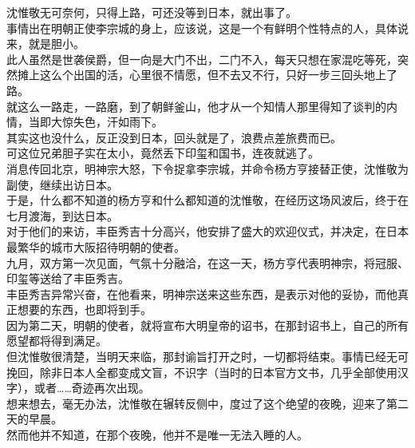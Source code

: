 \begin{multicols}{\theparacolNo}
沈惟敬无可奈何，只得上路，可还没等到日本，就出事了。\\

事情出在明朝正使李宗城的身上，应该说，这是一个有鲜明个性特点的人，具体说来，就是胆小。\\

此人虽然是世袭侯爵，但一向是大门不出，二门不入，每天只想在家混吃等死，突然摊上这么个出国的活，心里很不情愿，但不去又不行，只好一步三回头地上了路。\\

就这么一路走，一路磨，到了朝鲜釜山，他才从一个知情人那里得知了谈判的内情，当即大惊失色，汗如雨下。\\

其实这也没什么，反正没到日本，回头就是了，浪费点差旅费而已。\\

可这位兄弟胆子实在太小，竟然丢下印玺和国书，连夜就逃了。\\

消息传回北京，明神宗大怒，下令捉拿李宗城，并命令杨方亨接替正使，沈惟敬为副使，继续出访日本。\\

于是，什么都不知道的杨方亨和什么都知道的沈惟敬，在经历这场风波后，终于在七月渡海，到达日本。\\

对于他们的来访，丰臣秀吉十分高兴，他安排了盛大的欢迎仪式，并决定，在日本最繁华的城市大阪招待明朝的使者。\\

九月，双方第一次见面，气氛十分融洽，在这一天，杨方亨代表明神宗，将冠服、印玺等送给了丰臣秀吉。\\

丰臣秀吉异常兴奋，在他看来，明神宗送来这些东西，是表示对他的妥协，而他真正想要的东西，也即将到手。\\

因为第二天，明朝的使者，就将宣布大明皇帝的诏书，在那封诏书上，自己的所有愿望都将得到满足。\\

但沈惟敬很清楚，当明天来临，那封谕旨打开之时，一切都将结束。事情已经无可挽回，除非日本人全都变成文盲，不识字（当时的日本官方文书，几乎全部使用汉字），或者……奇迹再次出现。\\

想来想去，毫无办法，沈惟敬在辗转反侧中，度过了这个绝望的夜晚，迎来了第二天的早晨。\\

然而他并不知道，在那个夜晚，他并不是唯一无法入睡的人。\\


\end{multicols}
